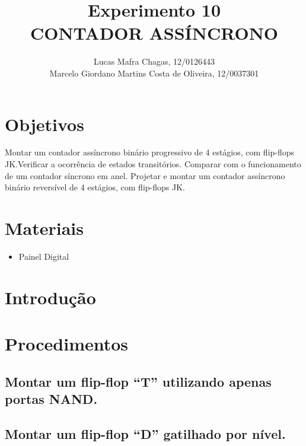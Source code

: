 \documentclass[12pt]{article}
\title{Experimento 10\\ 
	CONTADOR ASSÍNCRONO}
\author{
	Lucas Mafra Chagas, 12/0126443 \\
	Marcelo Giordano Martins Costa de Oliveira,  12/0037301
}
\begin{document}
	
	\maketitle
	
	\begin{abstract}
	
	\end{abstract}
	
	\begin{resumo} 
	
	\end{resumo}
	
	\section{Objetivos}
	\label{sec:Objetivos}
		Montar um contador assíncrono binário progressivo de 4 estágios, com flip-flops
		JK.Verificar a ocorrência de estados transitórios. Comparar com o funcionamento de
		um contador síncrono em anel. Projetar e montar um contador assíncrono binário
		reversível de 4 estágios, com flip-flops JK.
	
	
	\section{Materiais} 
	\label{sec:Materiais}
	
	\begin{itemize}
		\item Painel Digital
		
	\end{itemize}
	
	\section{Introdução}
	\label{sec:Introducao}
	
	
	
	\section{Procedimentos}
	\label{sec:Procedimentos}
	

	
	\subsection{Montar um flip-flop “T” utilizando apenas portas NAND.}

	
	\subsection{Montar um flip-flop “D” gatilhado por nível.}
	\label{2.2}
	
\end{document}
